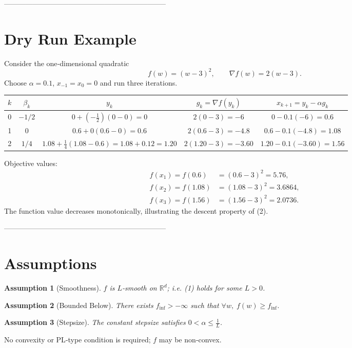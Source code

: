 \documentclass{article}
\newtheorem{assumption}{Assumption}
\newcommand{\R}{\mathbb{R}}
\begin{document}
--------------------------------------------------------------------

\section*{Dry Run Example}
Consider the one‑dimensional quadratic
\[
f(w) = (w-3)^2,
\qquad \nabla f(w)=2(w-3).
\]
Choose $\alpha=0.1$, $x_{-1}=x_0=0$ and run three iterations.

\begin{center}
\begin{tabular}{c|c|c|c|c}
$k$ & $\beta_k$ & $y_k$ & $g_k=\nabla f(y_k)$ & $x_{k+1}=y_k-\alpha g_k$ \\ \hline
0 & $-1/2$ & $0+(-\tfrac12)(0-0)=0$ & $2(0-3)=-6$ & $0-0.1(-6)=0.6$ \\[2mm]
1 & $0$   & $0.6+0(0.6-0)=0.6$ & $2(0.6-3)=-4.8$ & $0.6-0.1(-4.8)=1.08$ \\[2mm]
2 & $1/4$ & $1.08+\tfrac14(1.08-0.6)=1.08+0.12=1.20$ &
$2(1.20-3)=-3.60$ & $1.20-0.1(-3.60)=1.56$
\end{tabular}
\end{center}

Objective values:
\[
\begin{aligned}
f(x_1)=f(0.6)&=(0.6-3)^2=5.76,\\
f(x_2)=f(1.08)&=(1.08-3)^2=3.6864,\\
f(x_3)=f(1.56)&=(1.56-3)^2=2.0736 .
\end{aligned}
\]
The function value decreases monotonically, illustrating the descent property of (2).

--------------------------------------------------------------------

\section*{Assumptions}
\begin{assumption}[Smoothness]\label{ass:smooth}
$f$ is $L$‑smooth on $\R^d$; i.e. (1) holds for some $L>0$.
\end{assumption}
\begin{assumption}[Bounded Below]\label{ass:lb}
There exists $f_{\inf}>-\infty$ such that $\forall w,\; f(w)\ge f_{\inf}$.
\end{assumption}
\begin{assumption}[Stepsize]\label{ass:stepsize}
The constant stepsize satisfies $0<\alpha\le \tfrac{1}{L}$.
\end{assumption}
No convexity or PL‑type condition is required; $f$ may be non‑convex.
\end{document}
